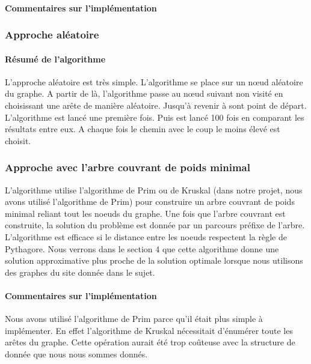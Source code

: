 \documentclass[10pt,a4paper]{report}
\begin{document}
		\paragraph{Commentaires sur l'implémentation\\}
		
		\subsubsection{Approche aléatoire}
		
		\paragraph{Résumé de l'algorithme\\}
		\begin{flushleft}
		L'approche aléatoire est très simple. L'algorithme se place sur un nœud aléatoire du graphe. A partir de là, l'algorithme passe au nœud suivant non visité en choisissant une arête de manière aléatoire. Jusqu'à revenir à sont point de départ.
		L'algorithme est lancé une première fois. Puis est lancé 100 fois en comparant les résultats entre eux. A chaque fois le chemin avec le coup le moins élevé est choisit.
		\end{flushleft}

		\subsubsection{Approche avec l'arbre couvrant de poids minimal}
		\begin{flushleft}
		L'algorithme utilise l'algorithme de Prim ou de Kruskal (dans notre projet, nous avons utilisé l'algorithme de Prim) pour construire un arbre couvrant de poids minimal reliant tout les noeuds du graphe. Une fois que l'arbre couvrant est construite, la solution du problème est donnée par un parcours préfixe de l'arbre.
		L'algorithme est efficace si le distance entre les noeuds respectent la règle de Pythagore. Nous verrons dans le section 4 que cette algorithme donne une solution approximative plus proche de la solution optimale lorsque nous utilisons des graphes du site donnée dans le sujet.
		\end{flushleft}
			
		\paragraph{Commentaires sur l'implémentation}
		
		\begin{flushleft}
		Nous avons utilisé l'algorithme de Prim parce qu'il était plus simple à implémenter. En effet l'algorithme de Kruskal nécessitait d’énumérer toute les arêtes du graphe. Cette opération aurait été trop coûteuse avec la structure de donnée que nous nous sommes donnés.
		\end{flushleft}
		
\end{document}
